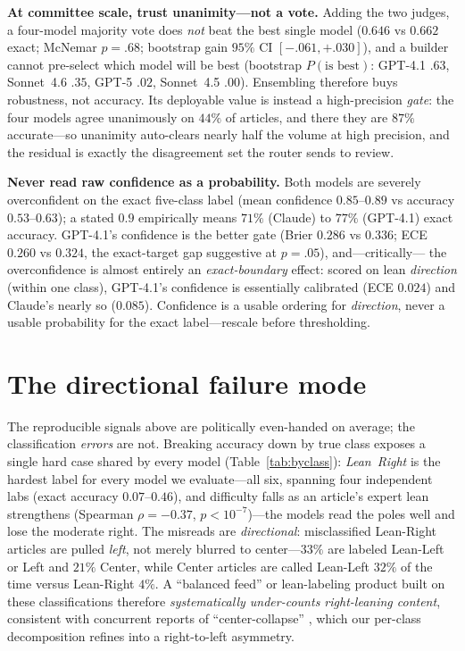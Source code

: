 \documentclass{article}
\begin{document}
\textbf{At committee scale, trust unanimity---not a vote.} Adding the two
judges, a four-model majority vote does \emph{not} beat the best single
model ($0.646$ vs $0.662$ exact; McNemar $p{=}.68$; bootstrap gain
$95\%$ CI $[-.061,+.030]$), and a builder cannot pre-select which model
will be best (bootstrap $P(\text{is best})$: GPT-4.1 $.63$, Sonnet~4.6
$.35$, GPT-5 $.02$, Sonnet~4.5 $.00$). Ensembling therefore buys
robustness, not accuracy. Its deployable value is instead a
high-precision \emph{gate}: the four models agree unanimously on $44\%$
of articles, and there they are $87\%$ accurate---so unanimity auto-clears
nearly half the volume at high precision, and the residual is exactly the
disagreement set the router sends to review.

\textbf{Never read raw confidence as a probability.} Both models are
severely overconfident on the exact five-class label (mean confidence
$0.85$--$0.89$ vs accuracy $0.53$--$0.63$); a stated $0.9$ empirically
means $71\%$ (Claude) to $77\%$ (GPT-4.1) exact accuracy. GPT-4.1's
confidence is the better gate (Brier $0.286$ vs $0.336$; ECE $0.260$ vs
$0.324$, the exact-target gap suggestive at $p{=}.05$), and---critically---
the overconfidence is almost entirely an \emph{exact-boundary} effect:
scored on lean \emph{direction} (within one class), GPT-4.1's confidence
is essentially calibrated (ECE $0.024$) and Claude's nearly so ($0.085$).
Confidence is a usable ordering for \emph{direction}, never a usable
probability for the exact label---rescale before thresholding.

\section{The directional failure mode}

The reproducible signals above are politically even-handed on average;
the classification \emph{errors} are not. Breaking accuracy down by true
class exposes a single hard case shared by every model
(Table~\ref{tab:byclass}): \emph{Lean~Right} is the hardest label for
every model we evaluate---all six, spanning four independent labs (exact
accuracy $0.07$--$0.46$), and difficulty falls as an
article's expert lean strengthens (Spearman $\rho{=}-0.37$,
$p{<}10^{-7}$)---the models read the poles well and lose the moderate
right. The misreads are \emph{directional}: misclassified Lean-Right
articles are pulled \emph{left}, not merely blurred to center---$33\%$
are labeled Lean-Left or Left and $21\%$ Center, while Center articles
are called Lean-Left $32\%$ of the time versus Lean-Right $4\%$. A
``balanced feed'' or lean-labeling product built on these
classifications therefore \emph{systematically under-counts right-leaning
content}, consistent with concurrent reports of ``center-collapse''
\citep{kennedy2026left}, which our per-class decomposition refines into a
right-to-left asymmetry.
\end{document}
